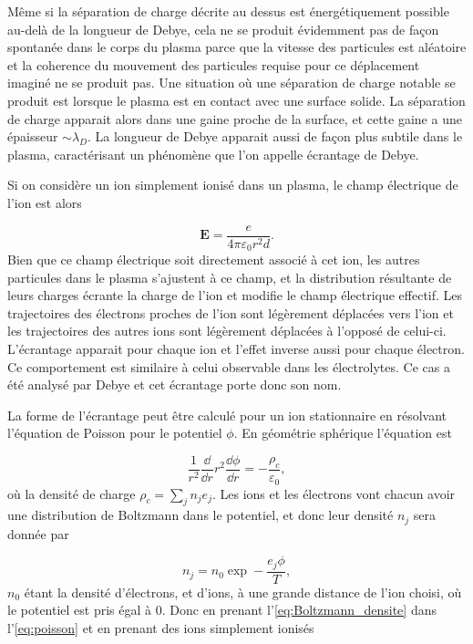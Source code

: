 \documentclass[main.tex]{subfiles}
\begin{document}
Même si la séparation de charge décrite au dessus est énergétiquement possible au-delà de la longueur de Debye, cela ne se produit évidemment pas de façon spontanée dans le corps du plasma parce que la vitesse des particules est aléatoire et la coherence du mouvement des particules requise pour ce déplacement imaginé ne se produit pas.
Une situation où une séparation de charge notable se produit est lorsque le plasma est en contact avec une surface solide.
La séparation de charge apparait alors dans une gaine proche de la surface, et cette gaine a une épaisseur \( \sim \lambda_D \).
La longueur de Debye apparait aussi de façon plus subtile dans le plasma, caractérisant un phénomène que l'on appelle écrantage de Debye.

Si on considère un ion simplement ionisé dans un plasma, le champ électrique de l'ion est alors

\[
	\bm{E} = \frac{e}{4\pi \varepsilon_0 r^2d}.
\]
Bien que ce champ électrique soit directement associé à cet ion, les autres particules dans le plasma s'ajustent à ce champ, et la distribution résultante de leurs charges écrante la charge de l’ion et modifie le champ électrique effectif.
Les trajectoires des électrons proches de l'ion sont légèrement déplacées vers l'ion et les trajectoires des autres ions sont légèrement déplacées à l'opposé de celui-ci.
L'écrantage apparait pour chaque ion et l'effet inverse aussi pour chaque électron.
Ce comportement est similaire à celui observable dans les électrolytes.
Ce cas a été analysé par Debye et cet écrantage porte donc son nom.

La forme de l'écrantage peut être calculé pour un ion stationnaire en résolvant l'équation de Poisson pour le potentiel \( \phi \).
En géométrie sphérique l'équation est

\begin{equation}
	\frac{1}{r^2} \frac{\dd}{\dd r}r^2 \frac{\dd \phi}{\dd r} = - \frac{\rho_c}{\varepsilon_0},
	\label{eq:poisson}
\end{equation}
où la densité de charge \( \rho_c = \sum_j n_j e_j \). Les ions et les électrons vont chacun avoir une distribution de Boltzmann dans le potentiel, et donc leur densité \( n_j \) sera donnée par

\begin{equation}
	n_j = n_0 \exp - \frac{e_j \phi}{T},
	\label{eq:Boltzmann_densite}
\end{equation}
\( n_0 \) étant la densité d'électrons, et d'ions, à une grande distance de l'ion choisi, où le potentiel est pris égal à \( 0 \).
Donc en prenant l'\autoref{eq:Boltzmann_densite} dans l'\autoref{eq:poisson} et en prenant des ions simplement ionisés
\end{document}
